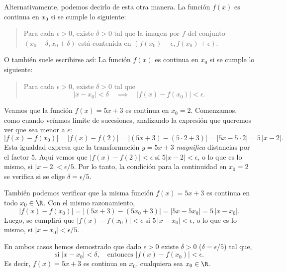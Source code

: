 \begin{remark}
    Alternativamente, podemos decirlo de esta otra manera.
    La función $f(x)$ es continua en $x_0$ si se cumple lo siguiente:
    \begin{quote}
        Para cada $\epsilon > 0$, existe $\delta > 0$ tal que
        la imagen por $f$ del conjunto $(x_0-\delta,x_0+\delta)$ está contenida en $(f(x_0)-\epsilon,f(x_0)+\epsilon)$.
    \end{quote}

    O también suele escribirse así:
    La función $f(x)$ es continua en $x_0$ si se cumple lo siguiente:
    \begin{quote}
        Para cada $\epsilon > 0$, existe $\delta > 0$ tal que
        \[ 
        |x-x_0|<\delta \quad\implies\quad |f(x) - f(x_0)| < \epsilon.
        \]
    \end{quote}

\end{remark}

\begin{example}
    Veamos que la función $f(x)=5x+3$ es continua en $x_0 = 2$. Comenzamos, como cuando veíamos límite de sucesiones, analizando la expresión que queremos ver que sea menor a $\epsilon$:
    \[
    |f(x)-f(x_0)|      
    = |f(x)-f(2)|  
    = |(5x+3)-(5\cdot 2 + 3)|  
    = |5x-5\cdot 2 |
    = 5 \, |x-2|.
    \]
    Esta igualdad expresa que la transformación $y=5x+3$ \emph{magnifica} distancias por el factor $5$. Aquí vemos que $|f(x)-f(2)|<\epsilon$ si $5 |x-2| < \epsilon$, o lo que es lo mismo, si $|x-2|<\epsilon/5$.
    Por lo tanto, la condición para la continuidad en $x_0=2$ se verifica si se elige $\delta = \epsilon/5$.

    También podemos verificar que la misma función $f(x)=5x+3$ es continua en todo $x_0\in \R$. Con el mismo razonamiento,
    \[
    |f(x)-f(x_0)|  
    = |(5x+3)-(5 x_0 + 3)|  
    = |5x-5 x_0 |
    = 5 \, |x-x_0|.
    \]
    Luego, se cumplirá que $|f(x)-f(x_0)| <\epsilon$ si $5 \, |x-x_0|<\epsilon$, o lo que es lo mismo, si $|x-x_0|<\epsilon/5$.

    En ambos casos hemos demostrado que dado $\epsilon>0$ existe $\delta>0$ ($\delta=\epsilon/5$) tal que, 
    \[
    \text{si } |x-x_0|<\delta, \quad\text{entonces } |f(x)-f(x_0)|<\epsilon.
    \]
    Es decir, $f(x)=5x+3$ es continua en $x_0$, cualquiera sea $x_0\in\R$.
\end{example}


